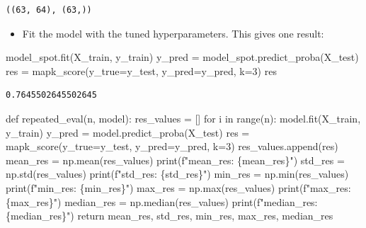 \documentclass[
  letterpaper,
  DIV=11,
  numbers=noendperiod]{scrreprt}
\newenvironment{Shaded}{\begin{snugshade}}{\end{snugshade}}
\newcommand{\BuiltInTok}[1]{\textcolor[rgb]{0.00,0.23,0.31}{#1}}
\newcommand{\ControlFlowTok}[1]{\textcolor[rgb]{0.00,0.23,0.31}{#1}}
\newcommand{\DecValTok}[1]{\textcolor[rgb]{0.68,0.00,0.00}{#1}}
\newcommand{\KeywordTok}[1]{\textcolor[rgb]{0.00,0.23,0.31}{#1}}
\newcommand{\NormalTok}[1]{\textcolor[rgb]{0.00,0.23,0.31}{#1}}
\newcommand{\OperatorTok}[1]{\textcolor[rgb]{0.37,0.37,0.37}{#1}}
\newcommand{\SpecialCharTok}[1]{\textcolor[rgb]{0.37,0.37,0.37}{#1}}
\newcommand{\SpecialStringTok}[1]{\textcolor[rgb]{0.13,0.47,0.30}{#1}}
\providecommand{\tightlist}{%
  \setlength{\itemsep}{0pt}\setlength{\parskip}{0pt}}\usepackage{longtable,booktabs,array}
\begin{document}
\begin{verbatim}
((63, 64), (63,))
\end{verbatim}

\begin{itemize}
\tightlist
\item
  Fit the model with the tuned hyperparameters. This gives one result:
\end{itemize}

\begin{Shaded}
\begin{Highlighting}[]
\NormalTok{model\_spot.fit(X\_train, y\_train)}
\NormalTok{y\_pred }\OperatorTok{=}\NormalTok{ model\_spot.predict\_proba(X\_test)}
\NormalTok{res }\OperatorTok{=}\NormalTok{ mapk\_score(y\_true}\OperatorTok{=}\NormalTok{y\_test, y\_pred}\OperatorTok{=}\NormalTok{y\_pred, k}\OperatorTok{=}\DecValTok{3}\NormalTok{)}
\NormalTok{res}
\end{Highlighting}
\end{Shaded}

\begin{verbatim}
0.7645502645502645
\end{verbatim}

\begin{Shaded}
\begin{Highlighting}[]
\KeywordTok{def}\NormalTok{ repeated\_eval(n, model):}
\NormalTok{    res\_values }\OperatorTok{=}\NormalTok{ []}
    \ControlFlowTok{for}\NormalTok{ i }\KeywordTok{in} \BuiltInTok{range}\NormalTok{(n):}
\NormalTok{        model.fit(X\_train, y\_train)}
\NormalTok{        y\_pred }\OperatorTok{=}\NormalTok{ model.predict\_proba(X\_test)}
\NormalTok{        res }\OperatorTok{=}\NormalTok{ mapk\_score(y\_true}\OperatorTok{=}\NormalTok{y\_test, y\_pred}\OperatorTok{=}\NormalTok{y\_pred, k}\OperatorTok{=}\DecValTok{3}\NormalTok{)}
\NormalTok{        res\_values.append(res)}
\NormalTok{    mean\_res }\OperatorTok{=}\NormalTok{ np.mean(res\_values)}
    \BuiltInTok{print}\NormalTok{(}\SpecialStringTok{f"mean\_res: }\SpecialCharTok{\{}\NormalTok{mean\_res}\SpecialCharTok{\}}\SpecialStringTok{"}\NormalTok{)}
\NormalTok{    std\_res }\OperatorTok{=}\NormalTok{ np.std(res\_values)}
    \BuiltInTok{print}\NormalTok{(}\SpecialStringTok{f"std\_res: }\SpecialCharTok{\{}\NormalTok{std\_res}\SpecialCharTok{\}}\SpecialStringTok{"}\NormalTok{)}
\NormalTok{    min\_res }\OperatorTok{=}\NormalTok{ np.}\BuiltInTok{min}\NormalTok{(res\_values)}
    \BuiltInTok{print}\NormalTok{(}\SpecialStringTok{f"min\_res: }\SpecialCharTok{\{}\NormalTok{min\_res}\SpecialCharTok{\}}\SpecialStringTok{"}\NormalTok{)}
\NormalTok{    max\_res }\OperatorTok{=}\NormalTok{ np.}\BuiltInTok{max}\NormalTok{(res\_values)}
    \BuiltInTok{print}\NormalTok{(}\SpecialStringTok{f"max\_res: }\SpecialCharTok{\{}\NormalTok{max\_res}\SpecialCharTok{\}}\SpecialStringTok{"}\NormalTok{)}
\NormalTok{    median\_res }\OperatorTok{=}\NormalTok{ np.median(res\_values)}
    \BuiltInTok{print}\NormalTok{(}\SpecialStringTok{f"median\_res: }\SpecialCharTok{\{}\NormalTok{median\_res}\SpecialCharTok{\}}\SpecialStringTok{"}\NormalTok{)}
    \ControlFlowTok{return}\NormalTok{ mean\_res, std\_res, min\_res, max\_res, median\_res}
\end{Highlighting}
\end{Shaded}
\end{document}
